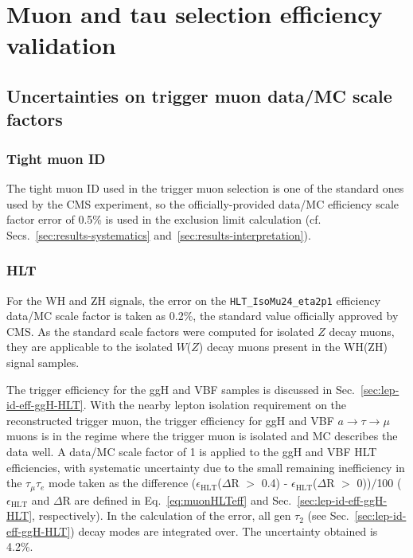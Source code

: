 \chapter{Muon and tau selection efficiency validation\label{sec:lepideff}}
\sloppy
\section{Uncertainties on trigger muon data/MC scale factors\label{sec:lepideff-triggermu}}

\subsection{Tight muon ID\label{lepideff-tightID}}

The tight muon ID used in the trigger muon selection is one of the standard ones used by the CMS experiment, so the officially-provided data/MC efficiency scale factor error of 0.5\% is used in the exclusion limit calculation (cf. Secs.~\ref{sec:results-systematics} and~\ref{sec:results-interpretation}).

\subsection{HLT\label{lepideff-HLT}}

For the WH and ZH signals, the error on the \texttt{HLT\_IsoMu24\_eta2p1} efficiency data/MC scale factor is taken as 0.2\%, the standard value officially approved by CMS.  As the standard scale factors were computed for isolated $Z$ decay muons, they are applicable to the isolated $W$($Z$) decay muons present in the WH(ZH) signal samples.

The trigger efficiency for the ggH and VBF samples is discussed in Sec.~\ref{sec:lep-id-eff-ggH-HLT}.  With the nearby lepton isolation requirement on the reconstructed trigger muon, the trigger efficiency for ggH and VBF $a\rightarrow\tau\to\mu$ muons is in the regime where the trigger muon is isolated and MC describes the data well.  A data/MC scale factor of 1 is applied to the ggH and VBF HLT efficiencies, with systematic uncertainty due to the small remaining inefficiency in the $\tau_{\mu}\tau_{e}$ mode taken as the difference ($\epsilon_{\text{HLT}}$($\Delta$R $>$ 0.4) - $\epsilon_{\text{HLT}}$($\Delta$R $>$ 0))$/$100 ($\epsilon_{\text{HLT}}$ and $\Delta$R are defined in Eq.~\ref{eq:muonHLTeff} and Sec.~\ref{sec:lep-id-eff-ggH-HLT}, respectively).  In the calculation of the error, all gen $\tau_{\text{2}}$ (see Sec.~\ref{sec:lep-id-eff-ggH-HLT}) decay modes are integrated over.  The uncertainty obtained is 4.2\%.


